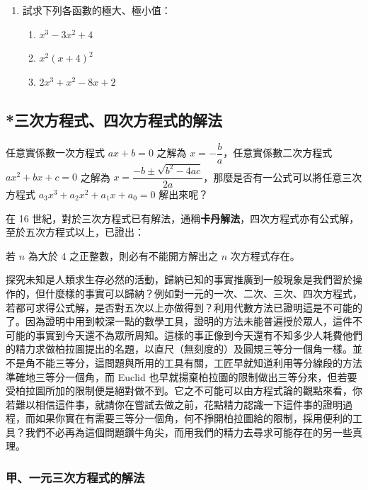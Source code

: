 \begin{enumerate}[label=\arabic*., leftmargin=2em]
  \item 試求下列各函數的極大、極小值：
  \begin{enumerate}[label=(\roman*)]
    \item $x^3-3x^2+4$
    \item $x^2(x+4)^2$
    \item $2x^3+x^2-8x+2$
  \end{enumerate}
\end{enumerate}

\subsection{*三次方程式、四次方程式的解法}\label{sec:b6s-2-5}
\resetsectcounters

任意實係數一次方程式 $ax+b=0$ 之解為 $x=-\dfrac{b}{a}$，任意實係數二次方程式 $ax^2+bx+c=0$ 之解為 $x=\dfrac{-b \pm \sqrt{b^2-4ac}}{2a}$，那麼是否有一公式可以將任意三次方程式 $a_3 x^3 + a_2 x^2 + a_1 x + a_0 = 0$ 解出來呢？

在 16 世紀，對於三次方程式已有解法，通稱\textbf{卡丹解法}，四次方程式亦有公式解，至於五次方程式以上，已證出：

\begin{theorem}\label{thm:b6s-2-abel-ruffini}
若 $n$ 為大於 4 之正整數，則必有不能開方解出之 $n$ 次方程式存在。
\end{theorem}

探究未知是人類求生存必然的活動，歸納已知的事實推廣到一般現象是我們習於操作的，但什麼樣的事實可以歸納？例如對一元的一次、二次、三次、四次方程式，若都可求得公式解，是否對五次以上亦做得到？利用代數方法已證明這是不可能的了。因為證明中用到較深一點的數學工具，證明的方法未能普遍授於眾人，這件不可能的事實到今天還不為眾所周知。這樣的事正像到今天還有不知多少人耗費他們的精力求做柏拉圖提出的名題，以直尺（無刻度的）及圓規三等分一個角一樣。並不是角不能三等分，這問題與所用的工具有關，工匠早就知道利用等分線段的方法準確地三等分一個角，而 Euclid 也早就揚棄柏拉圖的限制做出三等分來，但若要受柏拉圖所加的限制便是絕對做不到。它之不可能可以由方程式論的觀點來看，你若難以相信這件事，就請你在嘗試去做之前，花點精力認識一下這件事的證明過程，而如果你實在有需要三等分一個角，何不掙開柏拉圖給的限制，採用便利的工具？我們不必再為這個問題鑽牛角尖，而用我們的精力去尋求可能存在的另一些真理。

\subsubsection*{甲、一元三次方程式的解法}\label{subsec:b6s-2-5-a}

